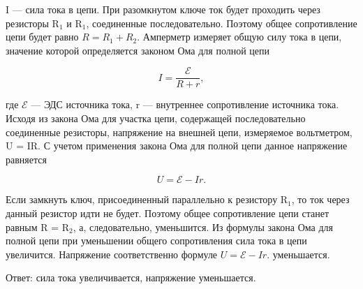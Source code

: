 \documentclass[12pt,a4paper]{article}
\begin{document}
{\begin{center}
\end{center}

I  — сила тока в цепи.
При разомкнутом ключе ток будет проходить через резисторы R$_{1}$ и R$_{1}$, соединенные последовательно. Поэтому общее сопротивление цепи будет равно $R = R_1 + R_2.$
Амперметр измеряет общую силу тока в цепи, значение которой определяется законом Ома для полной цепи

\[I = \frac{\mathcal{E}}{R + r} ,\]

где $\mathcal{E}$  — ЭДС источника тока, r  — внутреннее сопротивление источника тока.
Исходя из закона Ома для участка цепи, содержащей последовательно соединенные резисторы, напряжение на внешней цепи, измеряемое вольтметром, U  =  IR. С учетом применения закона Ома для полной цепи данное напряжение равняется

\[U = \mathcal{E} - Ir.\]

Если замкнуть ключ, присоединенный параллельно к резистору R$_{1}$, то ток через данный резистор идти не будет. Поэтому общее сопротивление цепи станет равным R  =  R$_{2}$, а, следовательно, уменьшится. 
Из формулы закона Ома для полной цепи при уменьшении общего сопротивления сила тока в цепи увеличится. Напряжение соответственно формуле $U = \mathcal{E} - Ir.$ уменьшается.

Ответ: сила тока увеличивается, напряжение уменьшается.
}
\end{document}
